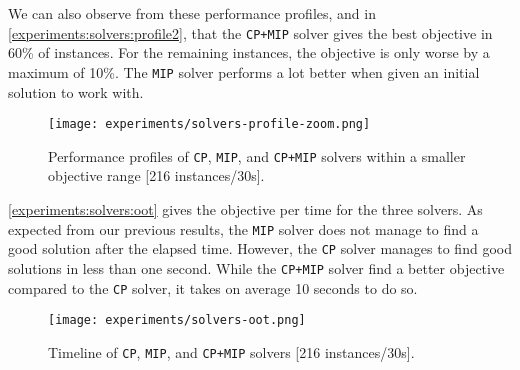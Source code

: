 \documentclass[../../thesis.tex]{subfiles}
\begin{document}
We can also observe from these performance profiles, and in \autoref{experiments:solvers:profile2}, that 
the \texttt{CP+MIP} solver gives the best objective in 60\% of instances. For the remaining instances, the objective is only worse by a maximum of 10\%. 
The \texttt{MIP} solver performs a lot better when given an initial solution to work with.


\begin{figure}
  \centering
  \texttt{[image: experiments/solvers-profile-zoom.png]}
  \caption{Performance profiles of \texttt{CP}, \texttt{MIP}, and \texttt{CP+MIP} solvers within a smaller objective range [216 instances/30s].}
  \label{experiments:solvers:profile2}
\end{figure}



\autoref{experiments:solvers:oot} gives the objective per time for the three solvers. As expected from our previous results, the \texttt{MIP} solver does not 
manage to find a good solution after the elapsed time. 
However, the \texttt{CP} solver manages to find good solutions in less than one second. While the \texttt{CP+MIP} solver find a 
better objective compared to the \texttt{CP} solver, it takes on average 10 seconds to do so.


\begin{figure}
  \centering
  \texttt{[image: experiments/solvers-oot.png]}
  \caption{Timeline of \texttt{CP}, \texttt{MIP}, and \texttt{CP+MIP} solvers [216 instances/30s].}
  \label{experiments:solvers:oot}
\end{figure}
\end{document}
